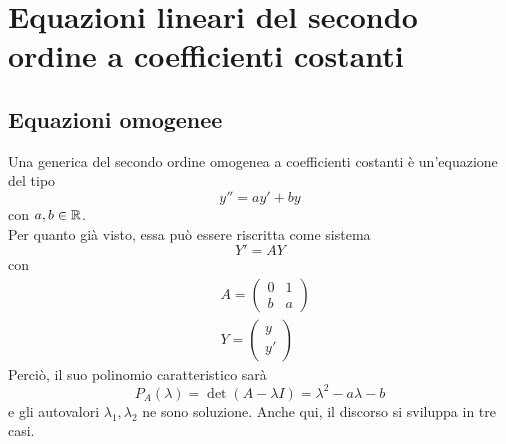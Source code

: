 \section{Equazioni lineari del secondo ordine a coefficienti costanti}
\subsection{Equazioni omogenee}
Una generica \ode del secondo ordine omogenea a coefficienti costanti è un'equazione del tipo
\begin{equation*}
    y''=ay'+by
\end{equation*}
con $a,b \in \mathbb{R}$.\\
Per quanto già visto, essa può essere riscritta come sistema
\begin{equation*}
    Y'=AY
\end{equation*}
con 
\begin{align}
    &A=\begin{pmatrix}
        0 & 1\\
        b & a
    \end{pmatrix}\\
    &Y=\begin{pmatrix}
        y\\
        y'
    \end{pmatrix}
\end{align}
Perciò, il suo polinomio caratteristico sarà
\begin{equation*}
    P_A(\lambda)=\det(A-\lambda I) = \lambda^2-a\lambda-b
\end{equation*}
e gli autovalori $\lambda_1, \lambda_2$ ne sono soluzione. Anche qui, il discorso si sviluppa in tre casi.
